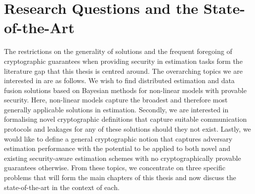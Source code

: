% 
%                                             
%                                             
%                                             
% 

\section{Research Questions and the State-of-the-Art}\label{sec:intro:sota}
The restrictions on the generality of solutions and the frequent foregoing of cryptographic guarantees when providing security in estimation tasks form the literature gap that this thesis is centred around. The overarching topics we are interested in are as follows. We wish to find distributed estimation and data fusion solutions based on Bayesian methods for non-linear models with provable security. Here, non-linear models capture the broadest and therefore most generally applicable solutions in estimation. Secondly, we are interested in formalising novel cryptographic definitions that capture suitable communication protocols and leakages for any of these solutions should they not exist. Lastly, we would like to define a general cryptographic notion that captures adversary estimation performance with the potential to be applied to both novel and existing security-aware estimation schemes with no cryptographically provable guarantees otherwise. From these topics, we concentrate on three specific problems that will form the main chapters of this thesis and now discuss the state-of-the-art in the context of each.

% 
% 

